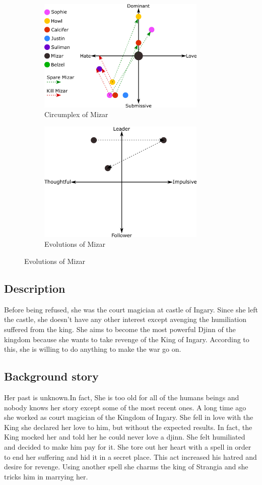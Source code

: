 \begin{figure}
\centering
\begin{subfigure}
  \centering
  \includegraphics[width=8cm]{Images/Circumplexes/mizarCircumplex}
  \caption{Circumplex of Mizar}
\end{subfigure}
\begin{subfigure}
  \centering
   \includegraphics[width=8cm]{Images/Evolutions/mizarEvolution}
  \caption{Evolutions of Mizar}
\end{subfigure}
\end{figure}

\subsection{Description}
Before being refused, she was the court magician at castle of Ingary. Since she left the castle, she doesn't have any other interest except avenging the humiliation suffered from the king.
She aims to become the most powerful Djinn of the kingdom because she wants to take revenge of the King of Ingary. According to this, she is willing to do anything to make the war go on.

\subsection{Background story}
Her past is unknown.In fact, She is too old for all of the humans beings and nobody knows her story except some of the most recent ones. A long time ago she worked as court magician of the Kingdom of Ingary. She fell in love with the King she declared her love to him, but without the expected results. In fact, the King mocked her and told her he could never love a djinn. She felt humiliated and decided to make him pay for it. She tore out her heart with a spell in order to end her suffering and hid it in a secret place. This act increased his hatred and desire for revenge. Using another spell she charms the king of Strangia and she tricks him in marrying her.



